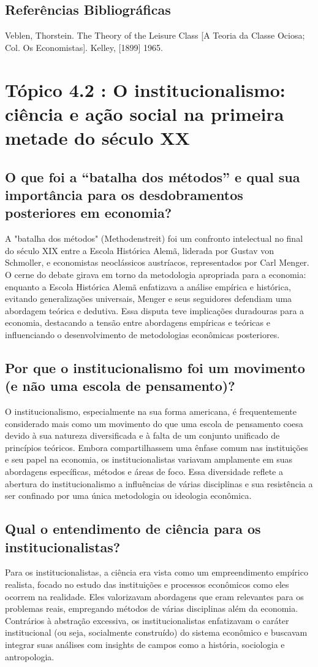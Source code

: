 \documentclass[a4paper,12pt]{article}[abntex2]
\begin{document}
\subsection{\textbf{Referências Bibliográficas}}
Veblen, Thorstein. The Theory of the Leisure Class [A Teoria da Classe Ociosa; Col. Os
Economistas]. Kelley, [1899] 1965.

\newpage
\section{\textbf{Tópico 4.2 : O institucionalismo: ciência e ação social na primeira metade do século XX}}
\subsection{\textbf{O que foi a “batalha dos métodos” e qual sua importância para os desdobramentos posteriores em economia?}}
A "batalha dos métodos" (Methodenstreit) foi um confronto intelectual no final do século XIX entre a Escola Histórica Alemã, liderada por Gustav von Schmoller, e economistas neoclássicos austríacos, representados por Carl Menger. O cerne do debate girava em torno da metodologia apropriada para a economia: enquanto a Escola Histórica Alemã enfatizava a análise empírica e histórica, evitando generalizações universais, Menger e seus seguidores defendiam uma abordagem teórica e dedutiva. Essa disputa teve implicações duradouras para a economia, destacando a tensão entre abordagens empíricas e teóricas e influenciando o desenvolvimento de metodologias econômicas posteriores.
\subsection{\textbf{Por que o institucionalismo foi um movimento (e não uma escola de pensamento)?}}
O institucionalismo, especialmente na sua forma americana, é frequentemente considerado mais como um movimento do que uma escola de pensamento coesa devido à sua natureza diversificada e à falta de um conjunto unificado de princípios teóricos. Embora compartilhassem uma ênfase comum nas instituições e seu papel na economia, os institucionalistas variavam amplamente em suas abordagens específicas, métodos e áreas de foco. Essa diversidade reflete a abertura do institucionalismo a influências de várias disciplinas e sua resistência a ser confinado por uma única metodologia ou ideologia econômica.
\subsection{\textbf{Qual o entendimento de ciência para os institucionalistas?}}
Para os institucionalistas, a ciência era vista como um empreendimento empírico realista, focado no estudo das instituições e processos econômicos como eles ocorrem na realidade. Eles valorizavam abordagens que eram relevantes para os problemas reais, empregando métodos de várias disciplinas além da economia. Contrários à abstração excessiva, os institucionalistas enfatizavam o caráter institucional (ou seja, socialmente construído) do sistema econômico e buscavam integrar suas análises com insights de campos como a história, sociologia e antropologia.
\end{document}
